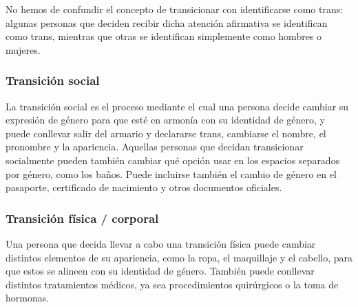 \documentclass[12pt,openany]{book}
\begin{document}
No hemos de confundir el concepto de transicionar con identificarse como trans: algunas personas que deciden recibir dicha atención afirmativa se identifican como trans, mientras que otras se identifican simplemente como hombres o mujeres.

\subsubsection*{Transición social}

La transición social es el proceso mediante el cual una persona decide cambiar su expresión de género para que esté en armonía con su identidad de género, y puede conllevar salir del armario y declararse trans, cambiarse el nombre, el pronombre y la apariencia. Aquellas personas que decidan transicionar socialmente pueden también cambiar qué opción usar en los espacios separados por género, como los baños. Puede incluirse también el cambio de género en el pasaporte, certificado de nacimiento y otros documentos oficiales.

\subsubsection*{Transición física / corporal }

Una persona que decida llevar a cabo una transición física puede cambiar distintos elementos de su apariencia, como la ropa, el maquillaje y el cabello, para que estos se alineen con su identidad de género. También puede conllevar distintos tratamientos médicos, ya sea procedimientos quirúrgicos o la toma de hormonas. 

\begin{figure}[h]
    \centering
\end{figure}
\end{document}
